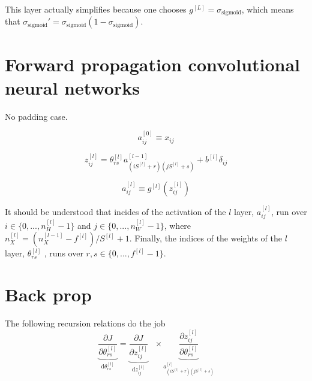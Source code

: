 \documentclass[a4paper,11pt]{article}
\newcommand{\dd}{\text{d}}
\newcommand{\na}[2]{a_{#1}^{[#2]}}
\newcommand{\nz}[2]{z_{#1}^{[#2]}}
\newcommand{\nt}[3]{\theta_{#1 #2}^{[#3]}}
\newcommand{\sg}{ \sigma_{\text{sigmoid}}}
\newcommand{\ff}[2]{#1 \left(#2 \right)}
\begin{document}
This layer actually simplifies because one chooses $g^{[L]}= \sg$, 
which means that $\sg'= \sg (1- \sg) $.


\section{Forward propagation convolutional neural networks}

No padding case.

\begin{equation}
    \na{ij}{0} \equiv x_{ij} %
\end{equation}

\begin{equation}
\nz{ij  }{l} = 
    \nt{r}{s}{l} 
    \na{(i S^{[l]}+r)(j S^{[l]}+s) }{l-1} 
    +b^{[l]}\delta_{ij} 
\end{equation}

\begin{equation}
    \na{ij}{l} \equiv \ff{g^{[l]}}{  
    \nz{ij  }{l}   }  %
\end{equation}



It should be understood that incides of the activation
of the $l$ layer, $\na{ij}{l}$, run over 
$i\in\{ 0,..., n_{H}^{[l]}-1  \}$ and $j\in\{ 0,..., n_{W}^{[l]} -1 \}$, where
$n_{X}^{[l]}= (n_{X}^{[l-1]}-f^{[l]})/S^{[l]}+1$. Finally, the indices of the 
weights of the $l$ layer, $\nt{r}{s}{l}$ , runs over $r,s\in \{0,..., f^{[l]}-1\}$.


\section{Back prop}

The following recursion relations do the job
\begin{equation}
    \underbrace{
    \frac{\partial J }{\partial  \nt{r}{s}{l}  }
    }_{\dd  \nt{r}{s}{l} } 
   =
   \underbrace{
    \frac{\partial J  }{\partial \nz{ij}{l} }
    }_{\dd  \nz{ij }{l} }\,\,\,\,  \times
    \underbrace{
    \frac{\partial \nz{ij}{l} }{\partial \nt{r}{s}{l}  }
    }_{ \na{(iS^{[l]}+r)(jS^{[l]}+s)}{l} }
\end{equation}

\end{document}
